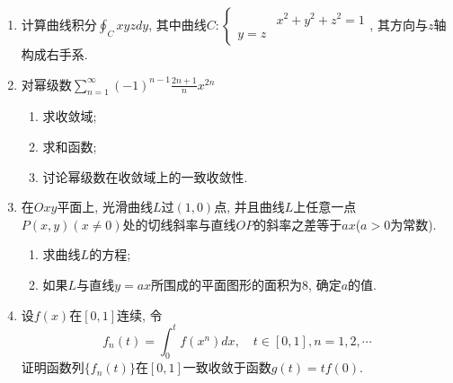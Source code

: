 \documentclass[12pt,a4paper,openany]{book}
\begin{document}
\begin{enumerate}
\item 计算曲线积分$\displaystyle\oint_{C}{xyzdy}$, 其中曲线$C: \left\{ \begin{aligned}&x^2 + y^2 + z^2 = 1 \\ y = z & \end{aligned}\right.$, 其方向与$z$轴构成右手系.

\item 对幂级数$\sum\limits_{n=1}^{\infty}{(-1)^{n-1}\frac{2n+1}{n}x^{2n}}$
\begin{enumerate}
\item 求收敛域;
\item 求和函数;
\item 讨论幂级数在收敛域上的一致收敛性.
\end{enumerate}

\item 在$Oxy$平面上, 光滑曲线$L$过$(1, 0)$点, 并且曲线$L$上任意一点$P(x, y)(x \neq 0)$处的切线斜率与直线$OP$的斜率之差等于$ax$($a > 0$为常数).
\begin{enumerate}
\item 求曲线$L$的方程;
\item 如果$L$与直线$y = ax$所围成的平面图形的面积为8, 确定$a$的值.
\end{enumerate}

\item 设$f(x)$在$[0, 1]$连续, 令
\[
f_n(t) = \int_{0}^{t}{f(x^n)dx}, \quad t \in [0, 1], n = 1, 2, \cdots
\]
证明函数列$\{f_n(t)\}$在$[0, 1]$一致收敛于函数$g(t) = tf(0)$.

\end{enumerate}
\end{document}
